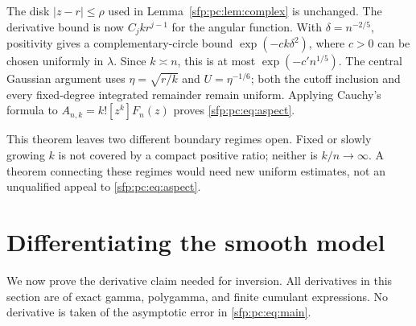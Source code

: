 \documentclass[11pt,letterpaper]{article}
\numberwithin{equation}{section}
\theoremstyle{definition}\newtheorem{definition}[theorem]{Definition}
\theoremstyle{remark}\newtheorem{remark}[theorem]{Remark}
\begin{document}
The disk $|z-r|\leq\rho$ used in Lemma~\ref{sfp:pc:lem:complex} is
unchanged. The derivative bound is now $C_jkr^{j-1}$ for the
angular function. With $\delta=n^{-2/5}$, positivity gives a
complementary-circle bound $\exp(-ck\delta^2)$, where $c>0$
can be chosen uniformly in $\lambda$. Since $k\asymp n$, this
is at most $\exp(-c' n^{1/5})$. The central Gaussian argument
uses $\eta=\sqrt{r/k}$ and $U=\eta^{-1/6}$; both the cutoff
inclusion and every fixed-degree integrated remainder remain
uniform. Applying Cauchy's formula to
$A_{n,k}=k![z^k]F_n(z)$ proves \eqref{sfp:pc:eq:aspect}.

This theorem leaves two different boundary regimes open. Fixed
or slowly growing $k$ is not covered by a compact positive ratio;
neither is $k/n\to\infty$. A theorem connecting these regimes
would need new uniform estimates, not an unqualified appeal to
\eqref{sfp:pc:eq:aspect}.

\section{Differentiating the smooth model}\label{sfp:pc:sec:differentiation}

We now prove the derivative claim needed for inversion. All
derivatives in this section are of exact gamma, polygamma, and
finite cumulant expressions. No derivative is taken of the
asymptotic error in \eqref{sfp:pc:eq:main}.
\end{document}
